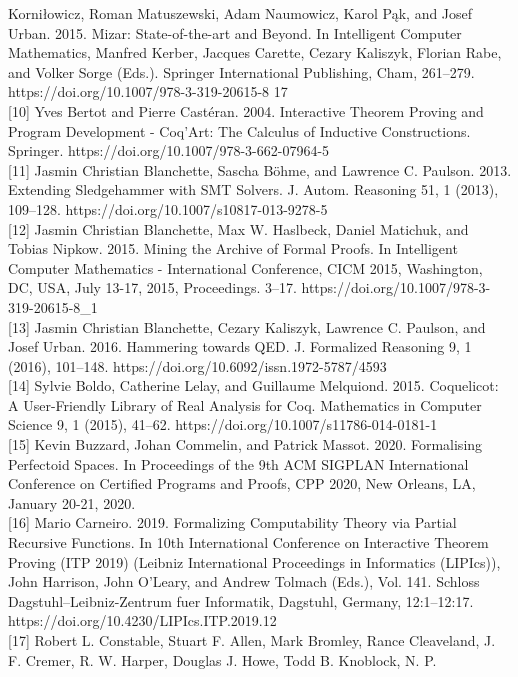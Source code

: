 \documentclass[
]{article}
\begin{document}
Korniłowicz, Roman Matuszewski, Adam Naumowicz, Karol Pąk, and Josef
Urban. 2015. Mizar: State-of-the-art and Beyond. In Intelligent Computer
Mathematics, Manfred Kerber, Jacques Carette, Cezary Kaliszyk, Florian
Rabe, and Volker Sorge (Eds.). Springer International Publishing, Cham,
261--279. https://doi.org/10.1007/978-3-319-20615-8 17\\
{[}10{]} Yves Bertot and Pierre Castéran. 2004. Interactive Theorem
Proving and Program Development - Coq'Art: The Calculus of Inductive
Constructions. Springer. https://doi.org/10.1007/978-3-662-07964-5\\
{[}11{]} Jasmin Christian Blanchette, Sascha Böhme, and Lawrence C.
Paulson. 2013. Extending Sledgehammer with SMT Solvers. J. Autom.
Reasoning 51, 1 (2013), 109--128.
https://doi.org/10.1007/s10817-013-9278-5\\
{[}12{]} Jasmin Christian Blanchette, Max W. Haslbeck, Daniel Matichuk,
and Tobias Nipkow. 2015. Mining the Archive of Formal Proofs. In
Intelligent Computer Mathematics - International Conference, CICM 2015,
Washington, DC, USA, July 13-17, 2015, Proceedings. 3--17.
https://doi.org/10.1007/978-3-319-20615-8\_1\\
{[}13{]} Jasmin Christian Blanchette, Cezary Kaliszyk, Lawrence C.
Paulson, and Josef Urban. 2016. Hammering towards QED. J. Formalized
Reasoning 9, 1 (2016), 101--148.
https://doi.org/10.6092/issn.1972-5787/4593\\
{[}14{]} Sylvie Boldo, Catherine Lelay, and Guillaume Melquiond. 2015.
Coquelicot: A User-Friendly Library of Real Analysis for Coq.
Mathematics in Computer Science 9, 1 (2015), 41--62.
https://doi.org/10.1007/s11786-014-0181-1\\
{[}15{]} Kevin Buzzard, Johan Commelin, and Patrick Massot. 2020.
Formalising Perfectoid Spaces. In Proceedings of the 9th ACM SIGPLAN
International Conference on Certified Programs and Proofs, CPP 2020, New
Orleans, LA, January 20-21, 2020.\\
{[}16{]} Mario Carneiro. 2019. Formalizing Computability Theory via
Partial Recursive Functions. In 10th International Conference on
Interactive Theorem Proving (ITP 2019) (Leibniz International
Proceedings in Informatics (LIPIcs)), John Harrison, John O'Leary, and
Andrew Tolmach (Eds.), Vol. 141. Schloss Dagstuhl--Leibniz-Zentrum fuer
Informatik, Dagstuhl, Germany, 12:1--12:17.
https://doi.org/10.4230/LIPIcs.ITP.2019.12\\
{[}17{]} Robert L. Constable, Stuart F. Allen, Mark Bromley, Rance
Cleaveland, J. F. Cremer, R. W. Harper, Douglas J. Howe, Todd B.
Knoblock, N. P.
\end{document}
